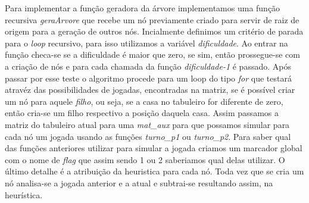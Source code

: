 \documentclass[a4paper, 12pt]{article}
\begin{document}
		\textrm{Para implementar a função geradora da árvore implementamos uma função recursiva \emph{geraArvore} que recebe um nó previamente criado para servir de raiz de origem para a geração de outros nós. Incialmente definimos um critério de parada para o \emph{loop} recursivo, para isso utilizamos a variável \emph{dificuldade}. Ao entrar na função checa-se se a dificuldade é maior que zero, se sim, então prossegue-se com a criação de nós e para cada chamada da função \emph{dificuldade-1} é passado. Após passar por esse teste o algoritmo procede para um loop do tipo \emph{for} que testará atravéz das possibilidades de jogadas, encontradas na matriz, se é possível criar um nó para aquele \emph{filho}, ou seja, se a casa no tabuleiro for diferente de zero, então cria-se um filho respectivo a posição daquela casa. Assim passamos a matriz do tabuleiro atual para uma \emph{mat_aux} para que possamos simular para cada nó um jogada usando as funções \emph{turno_p1} ou \emph{turno_p2}. Para saber qual das funções anteriores utilizar para simular a jogada criamos um marcador global com o nome de \emph{flag} que assim sendo 1 ou 2 saberiamos qual delas utilizar. O último detalhe é a atribuição da heuristica para cada nó. Toda vez que se cria um nó analisa-se a jogada anterior e a atual e subtrai-se resultando assim, na heurística.} %
		

\end{document}
